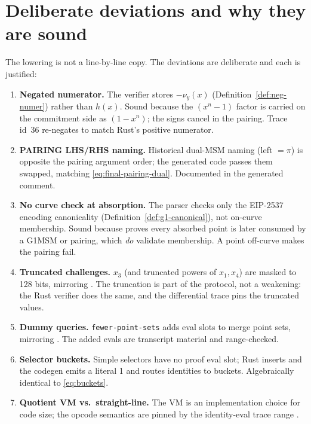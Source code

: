 \section{Deliberate deviations and why they are sound}
\label{sec:deviations}

The lowering is not a line-by-line copy. The deviations are deliberate and
each is justified:

\begin{enumerate}[leftmargin=1.6em,itemsep=3pt]
  \item \textbf{Negated numerator.} The verifier stores $-\nu_y(x)$
        (Definition~\ref{def:neg-numer}) rather than $h(x)$. Sound
        because the $(x^n-1)$ factor is carried on the commitment side as
        $(1-x^n)$; the signs cancel in the pairing. Trace id~36
        re-negates to match Rust's positive numerator.
  \item \textbf{PAIRING LHS/RHS naming.} Historical dual-MSM naming
        (left $=\pi$) is opposite the pairing argument order; the
        generated code passes them swapped, matching
        \eqref{eq:final-pairing-dual}. Documented in the generated
        comment.
  \item \textbf{No curve check at absorption.} The parser checks only the
        EIP-2537 encoding canonicality (Definition~\ref{def:g1-canonical}),
        not on-curve membership. Sound because
         proves every absorbed
        point is later consumed by a G1MSM or pairing, which \emph{do}
        validate membership. A point off-curve makes the pairing fail.
  \item \textbf{Truncated challenges.} $x_3$ (and truncated powers of
        $x_1,x_4$) are masked to 128 bits, mirroring
        . The truncation is part of the
        protocol, not a weakening: the Rust verifier does the same, and
        the differential trace pins the truncated values.
  \item \textbf{Dummy queries.} \texttt{fewer-point-sets} adds eval slots
        to merge point sets, mirroring
        . The added evals are transcript
        material and range-checked.
  \item \textbf{Selector buckets.} Simple selectors have no proof eval
        slot; Rust inserts  and the codegen emits a literal
        1 and routes identities to buckets. Algebraically identical to
        \eqref{eq:buckets}.
  \item \textbf{Quotient VM vs.\ straight-line.} The VM is an
        implementation choice for code size; the opcode semantics are
        pinned by the identity-eval trace range .
\end{enumerate}

